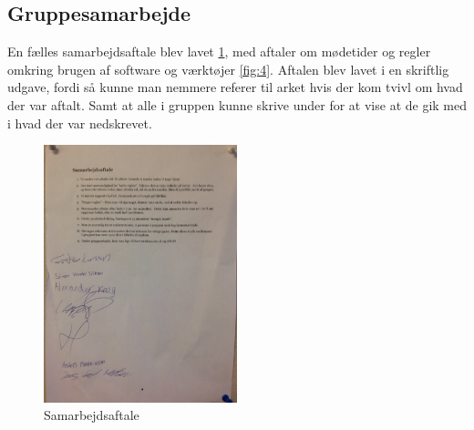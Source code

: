 \subsection{Gruppesamarbejde}
En fælles samarbejdsaftale blev lavet \cref{fig:SAftale}, med aftaler om mødetider og regler omkring brugen af software og værktøjer \cref{fig:4}. Aftalen blev lavet i en skriftlig udgave, fordi så kunne man nemmere referer til arket hvis der kom tvivl om hvad der var aftalt. Samt at alle i gruppen kunne skrive under for at vise at de gik med i hvad der var nedskrevet.

\begin{figure}[ht!]
  \centering
  \includegraphics[width=0.5\textwidth]{Images/S_Aftale.jpg}
  \caption{Samarbejdsaftale}
  \label{fig:SAftale}
\end{figure}

